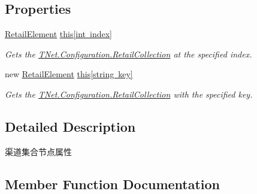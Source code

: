 \subsection*{Properties}
\begin{DoxyCompactItemize}
\item 
\mbox{\hyperlink{class_t_net_1_1_configuration_1_1_retail_element}{Retail\+Element}} \mbox{\hyperlink{class_t_net_1_1_configuration_1_1_retail_collection_afee6191f2ae49f7eeed547de9584b05d}{this\mbox{[}int index\mbox{]}}}
\begin{DoxyCompactList}\small\item\em Gets the \mbox{\hyperlink{class_t_net_1_1_configuration_1_1_retail_collection}{T\+Net.\+Configuration.\+Retail\+Collection}} at the specified index. \end{DoxyCompactList}\item 
new \mbox{\hyperlink{class_t_net_1_1_configuration_1_1_retail_element}{Retail\+Element}} \mbox{\hyperlink{class_t_net_1_1_configuration_1_1_retail_collection_a2d8383359c5542feec7ccec8ae696aca}{this\mbox{[}string key\mbox{]}}}
\begin{DoxyCompactList}\small\item\em Gets the \mbox{\hyperlink{class_t_net_1_1_configuration_1_1_retail_collection}{T\+Net.\+Configuration.\+Retail\+Collection}} with the specified key. \end{DoxyCompactList}\end{DoxyCompactItemize}


\subsection{Detailed Description}
渠道集合节点属性 



\subsection{Member Function Documentation}
\mbox{\label{class_t_net_1_1_configuration_1_1_retail_collection_af0827ebba5c6cbeb2fb73513bf2b1136}} 
